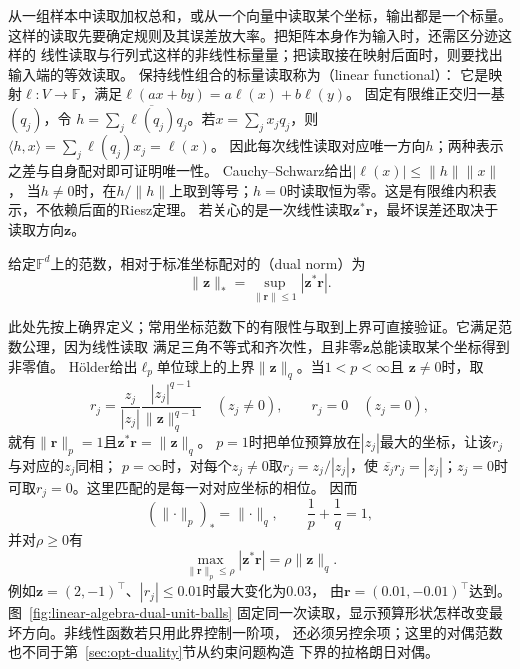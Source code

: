 从一组样本中读取加权总和，或从一个向量中读取某个坐标，输出都是一个标量。
这样的读取先要确定规则及其误差放大率。把矩阵本身作为输入时，还需区分迹这样的
线性读取与行列式这样的非线性标量量；把读取接在映射后面时，则要找出输入端的等效读取。
保持线性组合的标量读取称为（linear functional）：
它是映射$\ell:V\to\mathbb F$，满足$\ell(ax+by)=a\ell(x)+b\ell(y)$。
固定有限维正交归一基$(q_j)$，令
$h=\sum_j\overline{\ell(q_j)}q_j$。若$x=\sum_j x_jq_j$，则
$\langle h,x\rangle=\sum_j\ell(q_j)x_j=\ell(x)$。
因此每次线性读取对应唯一方向$h$；两种表示之差与自身配对即可证明唯一性。
Cauchy--Schwarz给出$|\ell(x)|\leq\lVert h\rVert\lVert x\rVert$，
当$h\neq0$时，在$h/\lVert h\rVert$上取到等号；$h=0$时读取恒为零。这是有限维内积表示，不依赖后面的Riesz定理。
若关心的是一次线性读取$\bm z^*\bm r$，最坏误差还取决于读取方向$\bm z$。
\begin{definition}[有限维对偶范数]
\label{def:linear-algebra-dual-norm}
给定$\mathbb F^d$上的范数，相对于标准坐标配对的（dual norm）为
\begin{equation}
 \lVert\bm z\rVert_*=\sup_{\lVert\bm r\rVert\leq1}|\bm z^*\bm r|.
 \label{eq:linear-algebra-dual-norm-definition}
\end{equation}
\end{definition}
此处先按上确界定义；常用坐标范数下的有限性与取到上界可直接验证。它满足范数公理，因为线性读取
满足三角不等式和齐次性，且非零$\bm z$总能读取某个坐标得到非零值。
Hölder给出$\ell_p$单位球上的上界$\lVert\bm z\rVert_q$。当$1<p<\infty$且
$\bm z\neq0$时，取
\[
 r_j=\frac{z_j}{|z_j|}
       \frac{|z_j|^{q-1}}{\lVert\bm z\rVert_q^{q-1}}\quad(z_j\neq0),
 \qquad r_j=0\quad(z_j=0),
\]
就有$\lVert\bm r\rVert_p=1$且$\bm z^*\bm r=\lVert\bm z\rVert_q$。
$p=1$时把单位预算放在$|z_j|$最大的坐标，让该$r_j$与对应的$z_j$同相；
$p=\infty$时，对每个$z_j\neq0$取$r_j=z_j/|z_j|$，使
$\overline{z_j}r_j=|z_j|$；$z_j=0$时可取$r_j=0$。这里匹配的是每一对对应坐标的相位。
因而
\begin{equation}
 (\lVert\cdot\rVert_p)_*=\lVert\cdot\rVert_q,\qquad \frac1p+\frac1q=1,
 \label{eq:linear-algebra-lp-duality}
\end{equation}
并对$\rho\geq0$有
\begin{equation}
 \max_{\lVert\bm r\rVert_p\leq\rho}|\bm z^*\bm r|
 =\rho\lVert\bm z\rVert_q.
 \label{eq:linear-algebra-linear-perturbation-duality}
\end{equation}
例如$\bm z=(2,-1)^\top$、$|r_j|\leq0.01$时最大变化为$0.03$，
由$\bm r=(0.01,-0.01)^\top$达到。图~\ref{fig:linear-algebra-dual-unit-balls}
固定同一次读取，显示预算形状怎样改变最坏方向。非线性函数若只用此界控制一阶项，
还必须另控余项；这里的对偶范数也不同于第~\ref{sec:opt-duality}节从约束问题构造
下界的拉格朗日对偶。

